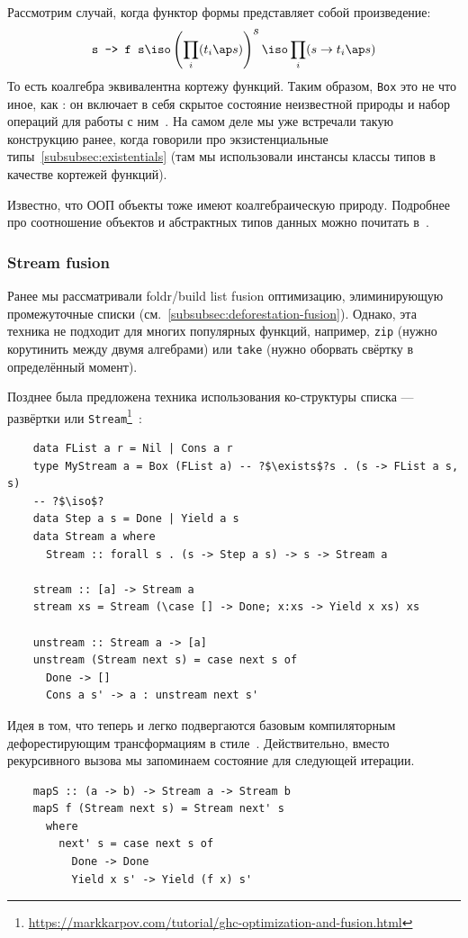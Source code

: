 Рассмотрим случай, когда функтор формы представляет собой произведение:
\[
    \text{\texttt{s -> f s}} \iso \left( \prod_{i}(t_i\ap s) \right)^{\displaystyle s} \iso \prod_i(s\to t_i\ap s)
\]
То есть коалгебра эквивалентна кортежу функций.
Таким образом, \texttt{Box} это не что иное, как : он включает в себя скрытое состояние неизвестной природы и набор операций для работы с ним~\cite{gibbons2008unfolding}.
На самом деле мы уже встречали такую конструкцию ранее, когда говорили про экзистенциальные типы~\ref{subsubsec:existentials} (там мы использовали инстансы классы типов в качестве кортежей функций).

Известно, что ООП объекты тоже имеют коалгебраическую природу.
Подробнее про соотношение объектов и абстрактных типов данных можно почитать в~\cite{cook2009understanding}.

\subsubsection{Stream fusion} \label{subsubsec:stream-fusion}

Ранее мы рассматривали foldr/build list fusion оптимизацию, элиминирующую промежуточные списки (см.~\ref{subsubsec:deforestation-fusion}).
Однако, эта техника не подходит для многих популярных функций, например, \texttt{zip} (нужно корутинить между двумя алгебрами) или \texttt{take} (нужно оборвать свёртку в определённый момент).

Позднее была предложена техника использования ко-структуры списка --- развёртки или \texttt{Stream}\footnote{\url{https://markkarpov.com/tutorial/ghc-optimization-and-fusion.html}}~\cite{coutts2007stream}:
\begin{verbatim}
    data FList a r = Nil | Cons a r
    type MyStream a = Box (FList a) -- ?$\exists$?s . (s -> FList a s, s)
    -- ?$\iso$?
    data Step a s = Done | Yield a s
    data Stream a where
      Stream :: forall s . (s -> Step a s) -> s -> Stream a

    stream :: [a] -> Stream a
    stream xs = Stream (\case [] -> Done; x:xs -> Yield x xs) xs

    unstream :: Stream a -> [a]
    unstream (Stream next s) = case next s of
      Done -> []
      Cons a s' -> a : unstream next s'
\end{verbatim}

Идея в том, что теперь  и легко подвергаются базовым компиляторным дефорестирующим трансформациям в стиле~\cite{wadler1988deforestation}.
Действительно, вместо рекурсивного вызова мы запоминаем состояние для следующей итерации.
\begin{verbatim}
    mapS :: (a -> b) -> Stream a -> Stream b
    mapS f (Stream next s) = Stream next' s
      where
        next' s = case next s of
          Done -> Done
          Yield x s' -> Yield (f x) s'
\end{verbatim}

